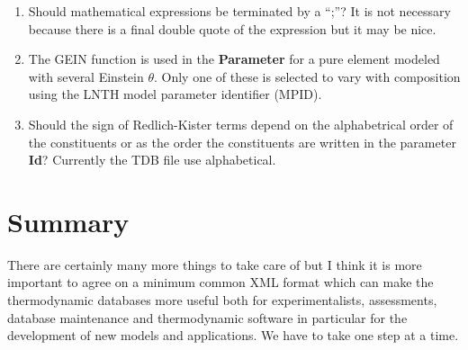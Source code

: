 \documentclass{article}
\begin{document}
\begin{enumerate}
\item Should mathematical expressions be terminated by a ``;''?  It is
  not necessary because there is a final double quote of the expression
  but it may be nice.

\item The GEIN function is used in the {\bf Parameter} for a pure
  element modeled with several Einstein $\theta$.  Only one of these
  is selected to vary with composition using the LNTH model parameter
  identifier (MPID).

\item Should the sign of Redlich-Kister terms depend on the
  alphabetrical order of the constituents or as the order the
  constituents are written in the parameter {\bf Id}?  Currently the
  TDB file use alphabetical.

%

\end{enumerate}

\section{Summary}

There are certainly many more things to take care of but I think it is
more important to agree on a minimum common XML format which can make
the thermodynamic databases more useful both for experimentalists,
assessments, database maintenance and thermodynamic software in
particular for the development of new models and applications.  We
have to take one step at a time.
\end{document}
